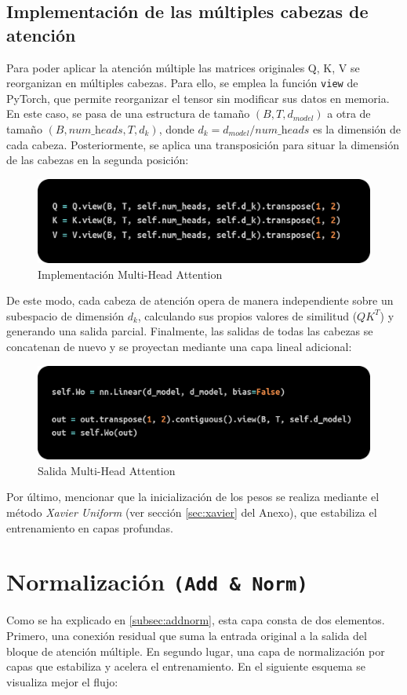 \documentclass[11pt]{book}
\theoremstyle{plain}
\theoremstyle{definition}
\begin{document}
\subsection{Implementación de las múltiples cabezas de atención}
Para poder aplicar la atención múltiple las matrices originales Q, K, V se reorganizan en múltiples cabezas. Para ello, se emplea la función \texttt{view} de PyTorch, que permite reorganizar el tensor sin modificar sus datos en memoria. En este caso, se pasa de una estructura de tamaño $(B, T, d_{model})$ a otra de tamaño $(B, \textit{num\_heads}, T, d_k)$, donde $d_k = d_{model} / \textit{num\_heads}$ es la dimensión de cada cabeza. Posteriormente, se aplica una transposición para situar la dimensión de las cabezas en la segunda posición:

\begin{figure}[h]
    \centering
    \includegraphics[width=0.5\linewidth]{img/heads.png}
    \caption{Implementación Multi-Head Attention}
    \label{fig:placeholder11}
\end{figure}

De este modo, cada cabeza de atención opera de manera independiente sobre un subespacio de dimensión $d_k$, calculando sus propios valores de similitud ($QK^T$) y generando una salida parcial. Finalmente, las salidas de todas las cabezas se concatenan de nuevo y se proyectan mediante una capa lineal adicional:

\begin{figure}[h]
    \centering
    \includegraphics[width=0.5\linewidth]{img/heads2.png}
    \caption{Salida Multi-Head Attention}
    \label{fig:placeholder12}
\end{figure}

Por último, mencionar que la inicialización de los pesos se realiza mediante el método \textit{Xavier Uniform} (ver sección \ref{sec:xavier} del Anexo), que estabiliza el entrenamiento en capas profundas. 

\section{Normalización \texttt{(Add \& Norm)}}
Como se ha explicado en \ref{subsec:addnorm}, esta capa consta de dos elementos. Primero, una conexión residual que suma la entrada original a la salida del bloque de atención múltiple. En segundo lugar, una capa de normalización por capas que estabiliza y acelera el entrenamiento. En el siguiente esquema se visualiza mejor el flujo: 
\end{document}
